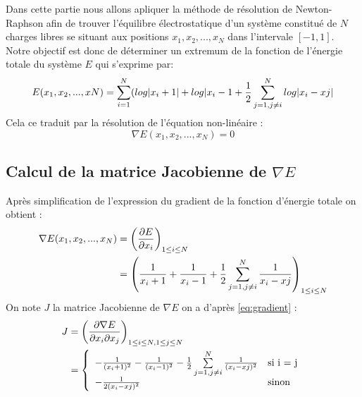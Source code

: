 Dans cette partie nous allons apliquer la méthode de résolution de Newton-Raphson afin de trouver l'équilibre électrostatique d'un système constitué de $N$ charges libres se situant aux positions $x_{1},x_{2},...,x_{N}$ dans l'intervale $[-1,1]$. Notre objectif est donc de déterminer un extremum de la fonction de l'énergie totale du système $E$ qui s'exprime par:
\begin{equation}
  E(x_{1},x_{2},...,x{N}) =  \sum\limits^{N}_{i=1}(log|x_{i}+1| + log|x_{i} -1 + \frac{1}{2}\sum\limits^{N}_{j=1,j \neq i} log|x_{i} - x{j}| 
\end{equation}
Cela ce traduit par la résolution de l'équation non-linéaire :
\begin{equation}
  \nabla E(x_{1},x_{2},...,x_{N}) = 0
\end{equation}

\subsection{Calcul de la matrice Jacobienne de $\nabla E$}
Après simplification de l'expression du gradient de la fonction d'énergie totale on obtient : 
\begin{equation}
  \label{eq:gradient}
  \begin{split}
    \nabla E(x_{1},x_{2},...,x_{N})  & = \left( \frac{\partial E }{\partial x_{i}}\right)_{1 \leq i \leq N} \\
    & = \left(\frac{1}{x_{i}+1} + \frac{1}{x_{i} -1} + \frac{1}{2} \sum\limits^{N}_{j=1,j\neq i}\frac{1}{x_{i}-x{j}}\right)_{1 \leq i \leq N }
  \end{split}
\end{equation}
On note $J$ la matrice Jacobienne de $\nabla E$
on a d'après \ref{eq:gradient} :
\begin{equation}
  \label{eq:jacobian}
  \begin{split}
    J & = \left(\frac{\partial \nabla E }{\partial x_{i} \partial x_{j}}\right)_{1 \leq i \leq N , 1 \leq j \leq N} \\
    & = \left\{
    \begin{array}{ll}
      -\frac{1}{(x_{i}+1)^{2}} - \frac{1}{(x_{i} -1)^{2}} - \frac{1}{2} \sum\limits^{N}_{j=1,j\neq i}\frac{1}{(x_{i}-x{j})^{2}}& \mbox{si i = j} \\
      -\frac{1}{2(x_{i} - x{j})^{2}} & \mbox{sinon} 
    \end{array}
    \right.
  \end{split}  
\end{equation}


